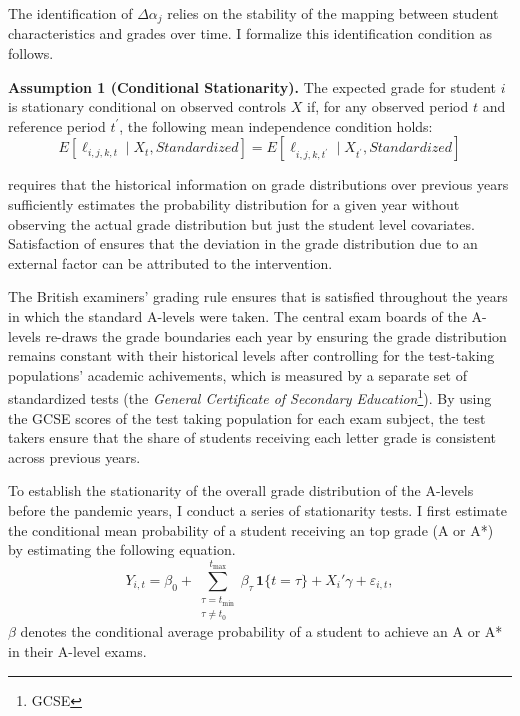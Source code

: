 The identification of $\Delta\alpha_j$ relies on the stability of the mapping between student characteristics and grades over time. I formalize this identification condition as follows.

\vspace{0.5em}

\noindent \textbf{Assumption 1 (Conditional Stationarity).} The expected grade for student $i$ is stationary conditional on observed controls $X$ if, for any observed period $t$ and reference period $t^{\prime}$, the following mean independence condition holds:
\begin{equation}
    \label{eq:stationary}
    E[\ell_{i,j,k,t} \mid X_{t}, Standardized] = E[\ell_{i,j,k,t^{\prime}} \mid X_{t^{\prime}}, Standardized]
\end{equation}

\noindent {} requires that the historical information on grade distributions over previous years sufficiently estimates the probability distribution for a given year without observing the actual grade distribution but just the student level covariates. Satisfaction of  ensures that the deviation in the grade distribution due to an external factor can be attributed to the intervention. 

The British examiners' grading rule ensures that  is satisfied throughout the years in which the standard A-levels were taken. The central exam boards of the A-levels re-draws the grade boundaries each year by ensuring the grade distribution remains constant with their historical levels after controlling for the test-taking populations' academic achivements, which is measured by a separate set of standardized tests (the \emph{General Certificate of Secondary Education}\footnote{GCSE}). By using the GCSE scores of the test taking population for each exam subject, the test takers ensure that the share of students receiving each letter grade is consistent across previous years.

To establish the stationarity of the overall grade distribution of the A-levels before the pandemic years, I conduct a series of stationarity tests. I first estimate the conditional mean probability of a student receiving an top grade (A or A*) by estimating the following equation.
\[
Y_{i,t} = \beta_0 
+ \sum_{\substack{\tau = t_{\min} \\ \tau \neq t_0}}^{t_{\max}}
    \beta_{\tau} \, \mathbf{1}\{t = \tau\}
+ X_i' \gamma
+ \varepsilon_{i,t},
\]
$\beta$ denotes the conditional average probability of a student to achieve an A or A* in their A-level exams. 

